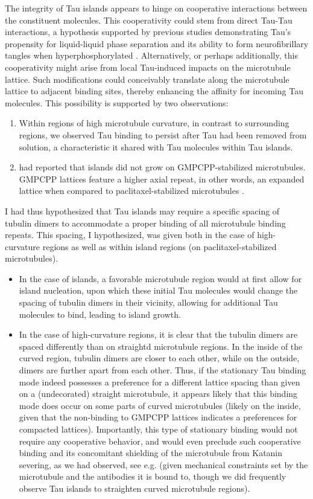 The integrity of Tau islands appears to hinge on cooperative interactions between the constituent molecules. This cooperativity could stem from direct Tau-Tau interactions, a hypothesis supported by previous studies demonstrating Tau's propensity for liquid-liquid phase separation \parencite{HERNANDEZVEGA20172304} and its ability to form neurofibrillary tangles when hyperphosphorylated \parencite{iqbal2016Tau}. Alternatively, or perhaps additionally, this cooperativity might arise from local Tau-induced impacts on the microtubule lattice. Such modifications could conceivably translate along the microtubule lattice to adjacent binding sites, thereby enhancing the affinity for incoming Tau molecules. This possibility is supported by two observations: 
\begin{enumerate}
    \item Within regions of high microtubule curvature, in contrast to surrounding regions, we observed Tau binding to persist after Tau had been removed from solution, a characteristic it shared with Tau molecules within Tau islands.
    \item \cite{tan2019microtubules} had reported that islands did not grow on GMPCPP-stabilized microtubules. GMPCPP lattices feature a higher axial repeat, in other words, an expanded lattice when compared to paclitaxel-stabilized microtubules .
\end{enumerate}
I had thus hypothesized that Tau islands may require a specific spacing of tubulin dimers to accommodate a proper binding of all microtubule binding repeats. This spacing, I hypothesized, was given both in the case of high-curvature regions as well as within island regions (on paclitaxel-stabilized microtubules). 
\begin{itemize}
    \item In the case of islands, a favorable microtubule region would at first allow for island nucleation, upon which these initial Tau molecules would change the spacing of tubulin dimers in their vicinity, allowing for additional Tau molecules to bind, leading to island growth.
    \item  In the case of high-curvature regions, it is clear that the tubulin dimers are spaced differently than on straightd microtubule regions. In the inside of the curved region, tubulin dimers are closer to each other, while on the outside, dimers are further apart from each other. Thus, if the stationary Tau binding mode indeed possesses a preference for a different lattice spacing than given on a (undecorated) straight microtubule, it appears likely that this binding mode does occur on some parts of curved microtubules (likely on the inside, given that the non-binding to GMPCPP lattices indicates a preferences for compacted lattices). Importantly, this type of stationary binding would not require any cooperative behavior, and would even preclude such cooperative binding and its concomitant shielding of the microtubule from Katanin severing, as we had observed, see e.g.  (given mechanical constraints set by the microtubule and the antibodies it is bound to, though we did frequently observe Tau islands to straighten curved microtubule regions). 
\end{itemize}
